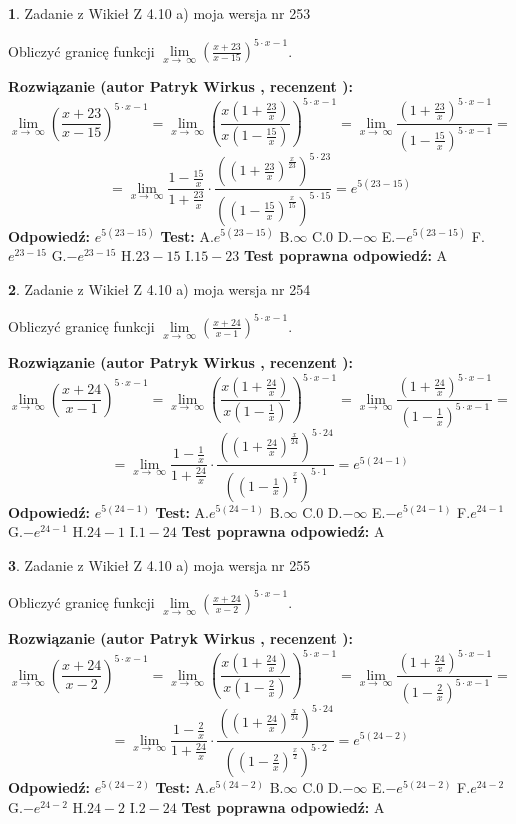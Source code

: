 \documentclass[12pt, a4paper]{article}
\theoremstyle{definition} %
\newtheorem{zad}{}
\newcommand{\zadStart}[1]{\begin{zad}#1\newline}
\newcommand{\zadStop}{\end{zad}}
\newcommand{\rozwStart}[2]{\noindent \textbf{Rozwiązanie (autor #1 , recenzent #2): }\newline}
\newcommand{\rozwStop}{\newline}
\newcommand{\odpStart}{\noindent \textbf{Odpowiedź:}\newline}
\newcommand{\odpStop}{\newline}
\newcommand{\testStart}{\noindent \textbf{Test:}\newline}
\newcommand{\testStop}{\newline}
\newcommand{\kluczStart}{\noindent \textbf{Test poprawna odpowiedź:}\newline}
\newcommand{\kluczStop}{\newline}
\begin{document}
\zadStart{Zadanie z Wikieł Z 4.10 a) moja wersja nr 253}


Obliczyć granicę funkcji  $\lim\limits_{x\to\ \infty}(\frac{x+23}{x-15})^{5\cdot x-1}$.
\zadStop
\rozwStart{Patryk Wirkus}{}
$$\lim\limits_{x\to\ \infty}(\frac{x+23}{x-15})^{5\cdot x-1} = \lim\limits_{x\to\ \infty}(\frac{x(1+\frac{23}{x})}{x(1-\frac{15}{x})})^{5\cdot x-1}=\lim\limits_{x\to\ \infty}\frac{(1+\frac{23}{x})^{5\cdot x-1}}{(1-\frac{15}{x})^{5\cdot x-1}}=$$
$$=\lim\limits_{x\to\ \infty}\frac{1-\frac{15}{x}}{1+\frac{23}{x}}\cdot\frac{((1+\frac{23}{x})^{\frac{x}{23}})^{5\cdot23}}{((1-\frac{15}{x})^{\frac{x}{15}})^{5\cdot15}}=e^{5(23-15)}$$
\rozwStop
\odpStart
$e^{5(23-15)}$
\odpStop
\testStart
A.$e^{5(23-15)}$ B.$\infty$ C.$0$ D.$-\infty$ E.$-e^{5(23-15)}$
F.$e^{23-15}$ G.$-e^{23-15}$
H.$23-15$
I.$15-23$
\testStop
\kluczStart
A
\kluczStop



\zadStart{Zadanie z Wikieł Z 4.10 a) moja wersja nr 254}


Obliczyć granicę funkcji  $\lim\limits_{x\to\ \infty}(\frac{x+24}{x-1})^{5\cdot x-1}$.
\zadStop
\rozwStart{Patryk Wirkus}{}
$$\lim\limits_{x\to\ \infty}(\frac{x+24}{x-1})^{5\cdot x-1} = \lim\limits_{x\to\ \infty}(\frac{x(1+\frac{24}{x})}{x(1-\frac{1}{x})})^{5\cdot x-1}=\lim\limits_{x\to\ \infty}\frac{(1+\frac{24}{x})^{5\cdot x-1}}{(1-\frac{1}{x})^{5\cdot x-1}}=$$
$$=\lim\limits_{x\to\ \infty}\frac{1-\frac{1}{x}}{1+\frac{24}{x}}\cdot\frac{((1+\frac{24}{x})^{\frac{x}{24}})^{5\cdot24}}{((1-\frac{1}{x})^{\frac{x}{1}})^{5\cdot1}}=e^{5(24-1)}$$
\rozwStop
\odpStart
$e^{5(24-1)}$
\odpStop
\testStart
A.$e^{5(24-1)}$ B.$\infty$ C.$0$ D.$-\infty$ E.$-e^{5(24-1)}$
F.$e^{24-1}$ G.$-e^{24-1}$
H.$24-1$
I.$1-24$
\testStop
\kluczStart
A
\kluczStop



\zadStart{Zadanie z Wikieł Z 4.10 a) moja wersja nr 255}


Obliczyć granicę funkcji  $\lim\limits_{x\to\ \infty}(\frac{x+24}{x-2})^{5\cdot x-1}$.
\zadStop
\rozwStart{Patryk Wirkus}{}
$$\lim\limits_{x\to\ \infty}(\frac{x+24}{x-2})^{5\cdot x-1} = \lim\limits_{x\to\ \infty}(\frac{x(1+\frac{24}{x})}{x(1-\frac{2}{x})})^{5\cdot x-1}=\lim\limits_{x\to\ \infty}\frac{(1+\frac{24}{x})^{5\cdot x-1}}{(1-\frac{2}{x})^{5\cdot x-1}}=$$
$$=\lim\limits_{x\to\ \infty}\frac{1-\frac{2}{x}}{1+\frac{24}{x}}\cdot\frac{((1+\frac{24}{x})^{\frac{x}{24}})^{5\cdot24}}{((1-\frac{2}{x})^{\frac{x}{2}})^{5\cdot2}}=e^{5(24-2)}$$
\rozwStop
\odpStart
$e^{5(24-2)}$
\odpStop
\testStart
A.$e^{5(24-2)}$ B.$\infty$ C.$0$ D.$-\infty$ E.$-e^{5(24-2)}$
F.$e^{24-2}$ G.$-e^{24-2}$
H.$24-2$
I.$2-24$
\testStop
\kluczStart
A
\kluczStop
\end{document}
